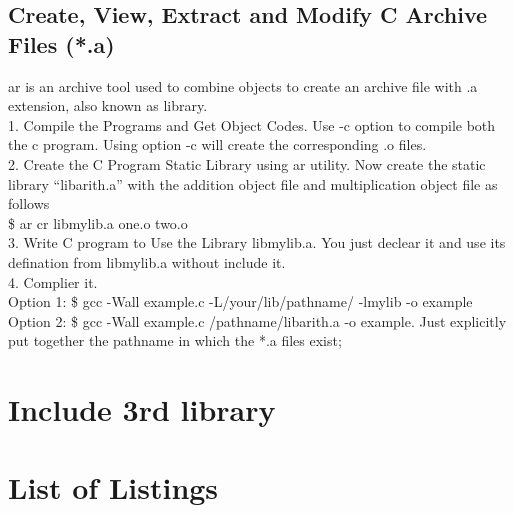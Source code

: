 \documentclass[a4paper, 12pt]{article}
\begin{document}
    \subsection{Create, View, Extract and Modify C Archive Files (*.a)}
    \textsf{ar} is an archive tool used to combine objects to create an archive file with .a extension, also known as library.\\
    1. Compile the Programs and Get Object Codes. Use -c option to compile both the c program. Using option -c will create the corresponding .o files.\\
    2. Create the C Program Static Library using ar utility. Now create the static library “libarith.a” with the addition object file and multiplication object file as follows\\
    \textsf{\$ ar cr libmylib.a one.o two.o}\\
    3. Write C program to Use the Library libmylib.a. You just declear it and use its defination from \textsf{libmylib.a} without include it.\\
    4. Complier it.\\
    Option 1: \$ gcc -Wall example.c -L/your/lib/pathname/ -lmylib -o example\\
    Option 2: \$ gcc -Wall example.c /pathname/libarith.a -o example. Just explicitly put together the pathname in which the *.a files exist;


    \section{Include 3rd library}



    \section*{List of Listings}
\end{document}
